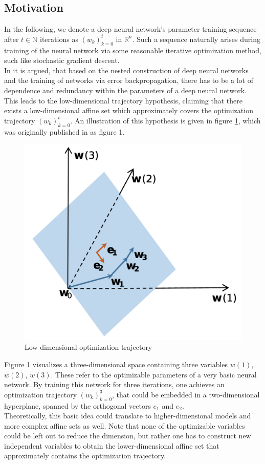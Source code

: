 \documentclass[11pt, a4paper]{article}
\newcommand{\N}{\mathbb{N}}
\newcommand{\R}{\mathbb{R}}
\begin{document}
\subsection{Motivation}

In the following, we denote a deep neural network's parameter training sequence after $t \in \N$ iterations as $(w_k)_{k=0}^t$ in $\R^n$. Such a sequence naturally arises during training of the neural network via some reasonable iterative optimization method, such like stochastic gradient descent. \\

In \cite{Paper} it is argued, that based on the nested construction of deep neural networks and the training of networks via error backpropagation, there has to be a lot of dependence and redundancy within the parameters of a deep neural network. This leads to the low-dimensional trajectory hypothesis, claiming that there exists a low-dimensional affine set which approximately covers the optimization trajectory $(w_k)_{k=0}^t$. An illustration of this hypothesis is given in figure \ref{fig:trajectory}, which was originally published in \cite{Paper} as figure 1.

\begin{figure}[!h]
\centering
\includegraphics[width=0.5\linewidth]{images/trajectory.png}
\caption{Low-dimensional optimization trajectory}
\label{fig:trajectory}
\end{figure}  

Figure \ref{fig:trajectory} visualizes a three-dimensional space containing three variables $w(1)$, $w(2)$, $w(3)$. These refer to the optimizable parameters of a very basic neural network. By training this network for three iterations, one achieves an optimization trajectory $(w_k)_{k=0}^3$, that could be embedded in a two-dimensional hyperplane, spanned by the orthogonal vectors $e_1$ and $e_2$. \\

Theoretically, this basic idea could translate to higher-dimensional models and more complex affine sets as well. Note that none of the optimizable variables could be left out to reduce the dimension, but rather one has to construct new independent variables to obtain the lower-dimensional affine set that approximately contains the optimization trajectory.  \\
\end{document}
